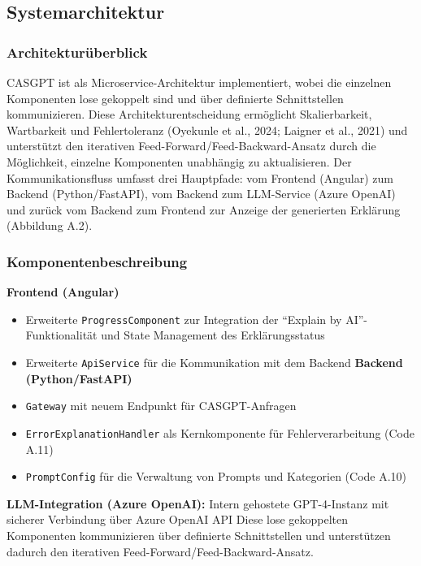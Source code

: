 \documentclass[
  a4paper,
  12pt,
  oneside,
  open=any,
  BCOR=12mm,
  DIV=14,
  parskip=half*,
  headsepline,
  footsepline,
  pointlessnumbers,
  liststotoc,
  numbers=noenddot,
  listof=totoc]{scrartcl}
\begin{document}
\subsection{Systemarchitektur}\label{systemarchitektur}

\subsubsection{Architekturüberblick}\label{architekturuxfcberblick}

CASGPT ist als Microservice-Architektur implementiert, wobei die
einzelnen Komponenten lose gekoppelt sind und über definierte
Schnittstellen kommunizieren. Diese Architekturentscheidung ermöglicht
Skalierbarkeit, Wartbarkeit und Fehlertoleranz (Oyekunle et al., 2024;
Laigner et al., 2021) und unterstützt den iterativen
Feed-Forward/Feed-Backward-Ansatz durch die Möglichkeit, einzelne
Komponenten unabhängig zu aktualisieren. Der Kommunikationsfluss umfasst
drei Hauptpfade: vom Frontend (Angular) zum Backend (Python/FastAPI),
vom Backend zum LLM-Service (Azure OpenAI) und zurück vom Backend zum
Frontend zur Anzeige der generierten Erklärung (Abbildung A.2).

\subsubsection{Komponentenbeschreibung}\label{komponentenbeschreibung}

\textbf{Frontend (Angular)}

\begin{itemize}
\item
  Erweiterte \texttt{ProgressComponent} zur Integration der ``Explain by
  AI''-Funktionalität und State Management des Erklärungsstatus
\item
  Erweiterte \texttt{ApiService} für die Kommunikation mit dem Backend
  \textbf{Backend (Python/FastAPI)}
\item
  \texttt{Gateway} mit neuem Endpunkt für CASGPT-Anfragen
\item
  \texttt{ErrorExplanationHandler} als Kernkomponente für
  Fehlerverarbeitung (Code A.11)
\item
  \texttt{PromptConfig} für die Verwaltung von Prompts und Kategorien
  (Code A.10)
\end{itemize}

\textbf{LLM-Integration (Azure OpenAI):} Intern gehostete GPT-4-Instanz
mit sicherer Verbindung über Azure OpenAI API Diese lose gekoppelten
Komponenten kommunizieren über definierte Schnittstellen und
unterstützen dadurch den iterativen Feed-Forward/Feed-Backward-Ansatz.
\end{document}
